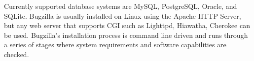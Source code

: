 Currently supported database systems are MySQL, PostgreSQL, Oracle, and SQLite. Bugzilla is usually installed on Linux using the Apache HTTP Server, but any web server that supports CGI such as Lighttpd, Hiawatha, Cherokee can be used. Bugzilla's installation process is command line driven and runs through a series of stages where system requirements and software capabilities are checked.


